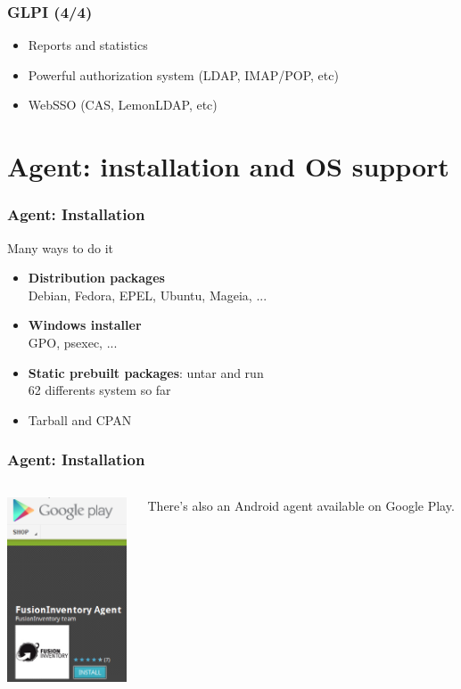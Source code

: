 \documentclass{beamer}
\begin{document}
\begin{frame}
    \frametitle{GLPI (4/4)}

    \begin{itemize}
    \item Reports and statistics
    \item Powerful authorization system (LDAP, IMAP/POP, etc)
    \item WebSSO (CAS, LemonLDAP, etc)
    \end{itemize}
\end{frame}

\section{Agent: installation and OS support}

\begin{frame}
    \frametitle{Agent: Installation}


    \begin{block}{Many ways to do it}
        \begin{itemize}
            \item \textbf{Distribution packages} \\
            \small{Debian, Fedora, EPEL, Ubuntu, Mageia, ...}
            \item \textbf{Windows installer} \\
            \small{GPO, psexec, ...}
            \item \textbf{Static prebuilt packages}: untar and run \\
            \small{62 differents system so far}
            \item Tarball and CPAN
        \end{itemize}
    \end{block}
\end{frame}

\begin{frame}
    \frametitle{Agent: Installation}

   \begin{columns}
   \begin{column}{0.35\textwidth}
\includegraphics[height=5.5cm]{pics/googleplay.png}
 \end{column}
 \begin{column}{0.65\textwidth}
There's also an Android agent available on Google Play.
 \end{column}
\end{columns}

\end{frame}
\end{document}
